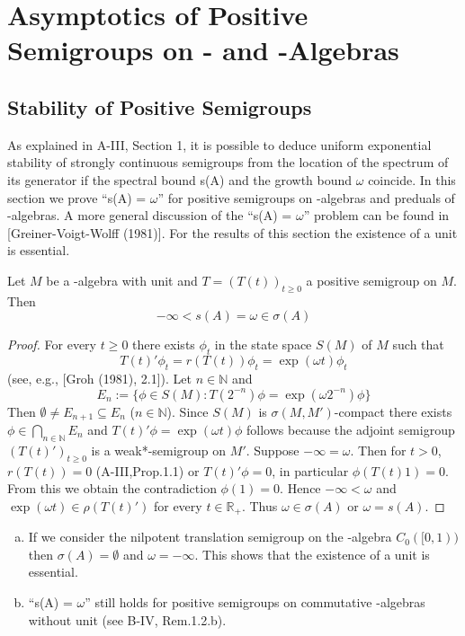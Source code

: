 
\chapter{Asymptotics of Positive Semigroups on \CA- and \WA-Algebras}\label{chap:D-IV}

\section{Stability of Positive Semigroups}

As explained in A-III, Section 1, it is possible to deduce uniform exponential stability of strongly continuous semigroups from the location of the spectrum of its generator if the spectral bound s(A) and the growth bound $\omega$ coincide.
In this section we prove \enquote{s(A) = $\omega$} for positive semigroups on \CA-algebras and preduals of \WA-algebras.
A more general discussion of the \enquote{s(A) = $\omega$} problem can be found in [Greiner-Voigt-Wolff (1981)].
For the results of this section the existence of a unit is essential.

\begin{theorem}\label{thm:1.1}
Let $M$ be a \CA-algebra with unit and $T = (T(t))_{t\geq 0}$ a positive semigroup on $M$.
Then
\[
-\infty < s(A) = \omega \in \sigma(A)
\]
\end{theorem}

\begin{proof}
For every $t \geq 0$ there exists $\phi_{t}$ in the state space $S(M)$ of $M$ such that
\[
T(t)'\phi_{t} = r(T(t))\phi_{t} = \exp(\omega t)\phi_{t}
\]
(see, e.g., [Groh (1981), 2.1]).
Let $n \in \mathbb{N}$ and
\[
E_{n} := \{\phi \in S(M) : T(2^{-n})\phi = \exp(\omega 2^{-n})\phi\}
\]
Then $\emptyset \neq E_{n+1} \subseteq E_{n}$ ($n \in \mathbb{N}$).
Since $S(M)$ is $\sigma(M,M')$-compact there exists $\phi \in \bigcap_{n \in \mathbb{N}} E_{n}$ and $T(t)'\phi = \exp(\omega t)\phi$ follows because the adjoint semigroup $(T(t)')_{t \geq 0}$ is a weak*-semigroup on $M'$.
Suppose $-\infty = \omega$.
Then for $t > 0$, $r(T(t)) = 0$ (A-III,Prop.1.1) or $T(t)'\phi = 0$, in particular $\phi(T(t)1) = 0$.
From this we obtain the contradiction $\phi(1) = 0$.
Hence $-\infty < \omega$ and $\exp(\omega t) \in \rho(T(t)')$ for every $t \in \mathbb{R}_{+}$.
Thus $\omega \in \sigma(A)$ or $\omega = s(A)$.
\end{proof}

\begin{remark}\label{rem:1.2}
\begin{enumerate}[(a)]
\item
If we consider the nilpotent translation semigroup on the \CA-algebra $C_{0}([0,1))$ then $\sigma(A) = \emptyset$ and $\omega = -\infty$.
This shows that the existence of a unit is essential.

\item
\enquote{s(A) = $\omega$} still holds for positive semigroups on commutative \CA-algebras without unit (see B-IV, Rem.1.2.b).
\end{enumerate}
\end{remark}

